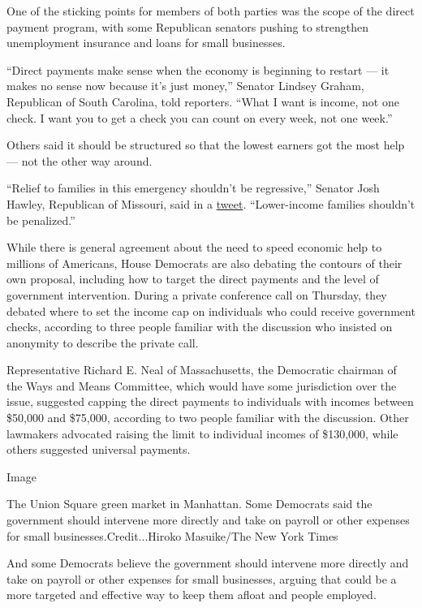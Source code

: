 One of the sticking points for members of both parties was the scope of
the direct payment program, with some Republican senators pushing to
strengthen unemployment insurance and loans for small businesses.

``Direct payments make sense when the economy is beginning to restart
--- it makes no sense now because it's just money,'' Senator Lindsey
Graham, Republican of South Carolina, told reporters. ``What I want is
income, not one check. I want you to get a check you can count on every
week, not one week.''

Others said it should be structured so that the lowest earners got the
most help --- not the other way around.

``Relief to families in this emergency shouldn't be regressive,''
Senator Josh Hawley, Republican of Missouri, said in a
\href{https://twitter.com/HawleyMO/status/1240769223267356673}{tweet}.
``Lower-income families shouldn't be penalized.''

While there is general agreement about the need to speed economic help
to millions of Americans, House Democrats are also debating the contours
of their own proposal, including how to target the direct payments and
the level of government intervention. During a private conference call
on Thursday, they debated where to set the income cap on individuals who
could receive government checks, according to three people familiar with
the discussion who insisted on anonymity to describe the private call.

Representative Richard E. Neal of Massachusetts, the Democratic chairman
of the Ways and Means Committee, which would have some jurisdiction over
the issue, suggested capping the direct payments to individuals with
incomes between \$50,000 and \$75,000, according to two people familiar
with the discussion. Other lawmakers advocated raising the limit to
individual incomes of \$130,000, while others suggested universal
payments.

Image

The Union Square green market in Manhattan. Some Democrats said the
government should intervene more directly and take on payroll or other
expenses for small businesses.Credit...Hiroko Masuike/The New York Times

And some Democrats believe the government should intervene more directly
and take on payroll or other expenses for small businesses, arguing that
could be a more targeted and effective way to keep them afloat and
people employed.


